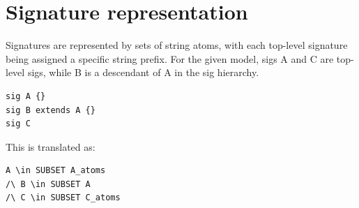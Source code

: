 \section{Signature representation}

Signatures are represented by sets of string atoms, with each top-level signature being assigned a specific string prefix. For the given model, sigs A and C are top-level sigs, while B is a descendant of A in the sig hierarchy.

\begin{lstlisting}
sig A {}
sig B extends A {}
sig C
\end{lstlisting}

This is translated as:

\begin{lstlisting}
A \in SUBSET A_atoms
/\ B \in SUBSET A
/\ C \in SUBSET C_atoms
\end{lstlisting}

\begin{lstlisting}
	
\end{lstlisting}

